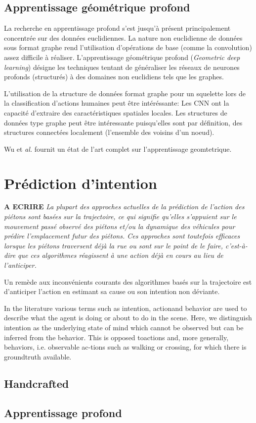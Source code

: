\subsection{Apprentissage géométrique profond}
La recherche en apprentissage profond s'est jusqu'à présent principalement concentrée sur des données euclidiennes.
La nature non euclidienne de données sous format graphe rend l'utilisation d'opérations de base (comme la convolution) assez difficile à réaliser. 
L'apprentissage géométrique profond (\textit{Geometric deep learning}\cite{scarselli2008graph,bronstein2017geometric}) désigne les techniques tentant de généraliser les réseaux de neurones profonds (structurés) à des domaines non euclidiens tels que les graphes. 

L'utilisation de la structure de données format graphe pour un squelette lors de la classification d'actions humaines peut être intéréssante: Les CNN ont la capacité d'extraire des caractéristiques spatiales locales. Les structures de données type graphe peut être intéressante puisqu'elles sont par définition, des structures connectées localement (l’ensemble des voisins d’un noeud).

Wu et\textit{ al.} \cite{wu2019comprehensive} fournit un état de l'art complet sur l'apprentissage geomtetrique.






\section{Prédiction d'intention}

\textbf{A ECRIRE}
\textit{La plupart des approches actuelles de la prédiction de l'action des piétons sont basées sur la trajectoire, ce qui signifie qu'elles s'appuient sur le mouvement passé observé des piétons et/ou la dynamique des véhicules pour prédire l'emplacement futur des piétons. Ces approches sont toutefois efficaces lorsque les piétons traversent déjà la rue ou sont sur le point de le faire, c'est-à-dire que ces algorithmes réagissent à une action déjà en cours au lieu de l'anticiper.}

Un remède aux inconvénients courants des algorithmes basés sur la trajectoire est d'anticiper l'action en estimant sa cause ou son intention non déviante.


In the literature various terms such as intention, actionand behavior are used to describe what the agent is doing or about to do in the scene. Here, we distinguish intention as the underlying state of mind which cannot be observed but can be inferred from the behavior. This is opposed toactions and, more generally, behaviors, i.e. observable ac-tions such as walking or crossing, for which there is groundtruth available.




\subsection{Handcrafted}
\subsection{Apprentissage profond}


